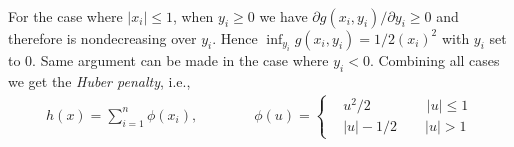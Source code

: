 \paragraph{}
For the case where $|x_i| \leq 1$, when $y_i \geq 0$ we have $\partial g(x_i,y_i)/ \partial y_i \geq 0$ and therefore is nondecreasing over $y_i$. Hence $\inf_{y_i}g(x_i,y_i) = 1/2(x_i)^2$ with $y_i$ set to 0. Same argument can be made in the case where $y_i <0$. Combining all cases we get the \textit{Huber penalty}, i.e.,
\begin{align*}
h(x) =\sum_{i=1}^{n}\phi(x_i), \qquad \qquad \phi(u) = \begin{cases}
&u^2/2 \qquad \qquad |u| \leq 1\\
&|u| - 1/2 \qquad |u| >1
\end{cases}
\end{align*}